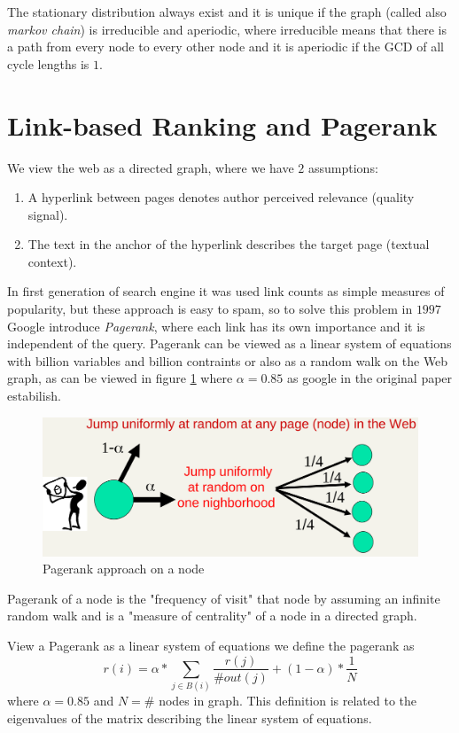 The stationary distribution always exist and it is unique if the graph 
(called also \emph{markov chain}) is irreducible and aperiodic, where
irreducible means that there is a path from every node to every other node
and it is aperiodic if the GCD of all cycle lengths is $1$.

\section{Link-based Ranking and Pagerank}
We view the web as a directed graph, where we have $2$ assumptions:
\begin{enumerate}
   \item A hyperlink between pages denotes author perceived relevance
	 (quality signal).
   \item The text in the anchor of the hyperlink describes the target page
	 (textual context).
\end{enumerate}


In first generation of search engine it was used link counts as simple
measures of popularity, but these approach is easy to spam, so to solve
this problem in $1997$ Google introduce \emph{Pagerank}, where each link
has its own importance and it is independent of the query.\newline
Pagerank can be viewed as a linear system of equations with billion variables
and billion contraints or also as a random walk on the Web graph, as can
be viewed in figure \ref{img:pagerank} where $\alpha = 0.85$ as google 
in the original paper estabilish.

\begin{figure}
	\includegraphics[width=\textwidth]{Images/pagerank}
	\caption{Pagerank approach on a node}
	\label{img:pagerank}
\end{figure}
Pagerank of a node is the "frequency of visit" that node by assuming an
infinite random walk and is a "measure of centrality"
of a node in a directed graph.

View a Pagerank as a linear system of equations we define the pagerank as 
\[ r(i) = \alpha * \sum _{j \in B(i)} \frac{r(j)}{\# out(j)} + 
	  (1 - \alpha) * \frac{1}{N} \]
where $\alpha = 0.85$ and $N = \#$ nodes in graph.\newline
This definition is related to the eigenvalues of the matrix 
describing the linear system of equations.

